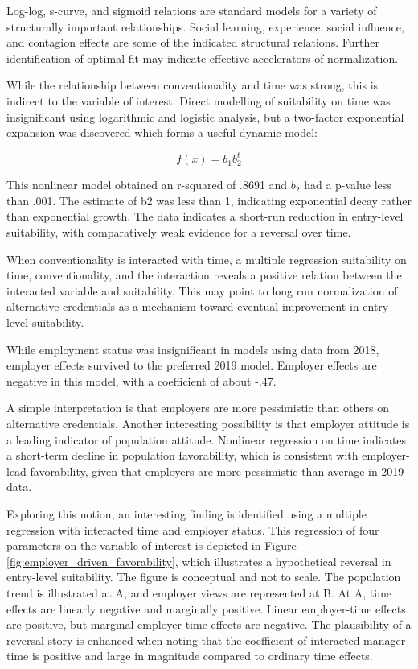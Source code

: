 \documentclass[AER]{./aea-latex-templates/AEA}
\begin{document}
Log-log, s-curve, and sigmoid relations are standard models for a variety of structurally important relationships.
Social learning, experience, social influence, and contagion effects are some of the
indicated structural relations\cite{young2009innovation}.
Further identification of optimal fit may indicate effective accelerators of normalization.

While the relationship between conventionality and time was strong,
this is indirect to the variable of interest. Direct modelling of suitability
on time was insignificant using logarithmic and logistic analysis, but
a two-factor exponential expansion was discovered which forms a useful dynamic model:

\begin{equation} f(x) = b_1b_2^t \end{equation}

This nonlinear model obtained an r-squared of .8691 and $b_2$ had a p-value
less than .001. The estimate of b2 was less than 1, indicating exponential
decay rather than exponential growth. The data indicates a short-run reduction in entry-level
suitability, with comparatively weak evidence for a reversal over time.

When conventionality is interacted with time, a multiple regression suitability on time, conventionality, and the interaction
reveals a positive relation between the interacted variable and suitability.
This may point to long run normalization of alternative credentials as a mechanism toward eventual improvement in entry-level suitability.

While employment status was insignificant in models using data from 2018,
employer effects survived to the preferred 2019 model.
Employer effects are negative in this model, with a coefficient of about -.47.

A simple interpretation is that employers are more pessimistic than others
on alternative credentials. Another interesting possibility is that employer attitude is a leading indicator of population attitude.
Nonlinear regression on time indicates a short-term decline in population favorability,
which is consistent with employer-lead favorability, given that employers are more pessimistic than average in 2019 data.

Exploring this notion, an interesting finding is identified using a multiple regression with interacted time and employer status.
This regression of four parameters on the variable of interest is depicted in
Figure \ref{fig:employer_driven_favorability}, which illustrates a hypothetical reversal in entry-level
suitability. The figure is conceptual and not to scale. The population
trend is illustrated at A, and employer views are represented at B. At A,
time effects are linearly negative and marginally positive. Linear
employer-time effects are positive, but marginal employer-time effects are
negative. The plausibility of a reversal story is enhanced when noting
that the coefficient of interacted manager-time is positive and large in magnitude compared to ordinary time effects.
\end{document}
